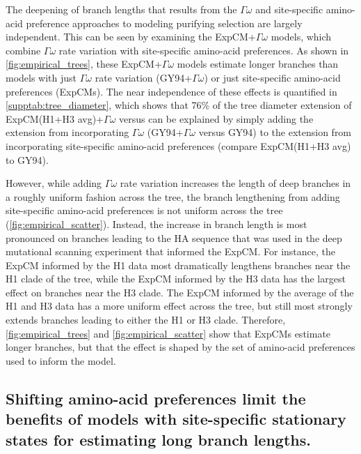 \documentclass[11pt]{article}
\begin{document}
The deepening of branch lengths that results from the $\Gamma\omega$ and site-specific amino-acid preference approaches to modeling purifying selection are largely independent.
This can be seen by examining the ExpCM+$\Gamma\omega$ models, which combine $\Gamma\omega$ rate variation with site-specific amino-acid preferences.
As shown in \ref{fig:empirical_trees}, these ExpCM+$\Gamma\omega$ models estimate longer branches than models with just $\Gamma\omega$ rate variation (GY94+$\Gamma\omega$) or just site-specific amino-acid preferences (ExpCMs).
The near independence of these effects is quantified in \ref{supptab:tree_diameter}, which shows that 76\% of the tree diameter extension of ExpCM(H1+H3 avg)+$\Gamma\omega$ versus can be explained by simply adding the extension from incorporating $\Gamma\omega$ (GY94+$\Gamma\omega$ versus GY94) to the extension from incorporating site-specific amino-acid preferences (compare ExpCM(H1+H3 avg) to GY94).

However, while adding $\Gamma\omega$ rate variation increases the length of deep branches in a roughly uniform fashion across the tree, the branch lengthening from adding site-specific amino-acid preferences is not uniform across the tree (\ref{fig:empirical_scatter}). 
Instead, the increase in branch length is most pronounced on branches leading to the HA sequence that was used in the deep mutational scanning experiment that informed the ExpCM.
For instance, the ExpCM informed by the H1 data most dramatically lengthens branches near the H1 clade of the tree, while the ExpCM informed by the H3 data has the largest effect on branches near the H3 clade.
The ExpCM informed by the average of the H1 and H3 data has a more uniform effect across the tree, but still most strongly extends branches leading to either the H1 or H3 clade.
Therefore, \ref{fig:empirical_trees} and \ref{fig:empirical_scatter} show that ExpCMs estimate longer branches, but that the effect is shaped by the set of amino-acid preferences used to inform the model.

\subsection*{Shifting amino-acid preferences limit the benefits of models with site-specific stationary states for estimating long branch lengths.}
\end{document}
